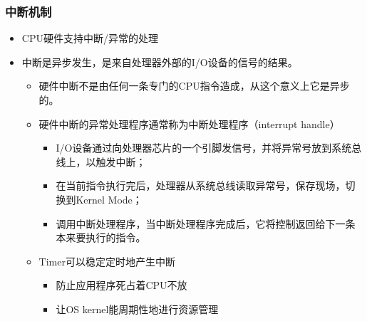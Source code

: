 \documentclass[UTF8]{ctexbeamer}
\begin{document}
\begin{frame}
	\frametitle{中断机制}
	\begin{itemize}
		\item CPU硬件支持中断/异常的处理
		\item 中断是异步发生，是来自处理器外部的I/O设备的信号的结果。
		\begin{itemize}
			\item 硬件中断不是由任何一条专门的CPU指令造成，从这个意义上它是异步的。
			\item 硬件中断的异常处理程序通常称为中断处理程序（interrupt handle）
			\begin{itemize}
				\item I/O设备通过向处理器芯片的一个引脚发信号，并将异常号放到系统总线上，以触发中断；
				\item 在当前指令执行完后，处理器从系统总线读取异常号，保存现场，切换到Kernel Mode；
				\item 调用中断处理程序，当中断处理程序完成后，它将控制返回给下一条本来要执行的指令。
			\end{itemize}			
			
			\item Timer可以稳定定时地产生中断
			\begin{itemize}
				\item 防止应用程序死占着CPU不放
				\item 让OS kernel能周期性地进行资源管理
			\end{itemize}				
		\end{itemize}
	\end{itemize}
\end{frame}

\end{document}
